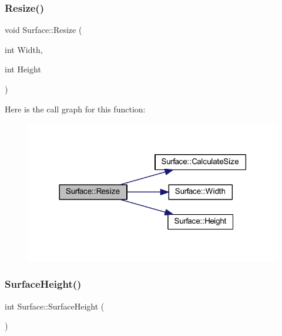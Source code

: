 \subsubsection{Resize()}
{\footnotesize\ttfamily void Surface\+::\+Resize (\begin{DoxyParamCaption}\item[{int}]{Width,  }\item[{int}]{Height }\end{DoxyParamCaption})}

Here is the call graph for this function\+:\nopagebreak
\begin{figure}[H]
\begin{center}
\leavevmode
\includegraphics[width=318pt]{class_surface_a5e45e936e3057fa1ddad0c7924767005_cgraph}
\end{center}
\end{figure}
\mbox{\label{class_surface_a377c59f6ef131d4b879cda93578a3efa}} 
\subsubsection{Surface\+Height()}
{\footnotesize\ttfamily int Surface\+::\+Surface\+Height (\begin{DoxyParamCaption}{ }\end{DoxyParamCaption})\hspace{0.3cm}{\ttfamily [inline]}}

